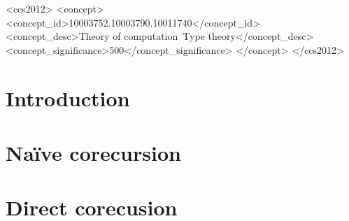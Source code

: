 \documentclass[sigplan, screen, natbib=false, review]{acmart}
\begin{document}
\begin{CCSXML}
  <ccs2012>
  <concept>
  <concept_id>10003752.10003790.10011740</concept_id>
  <concept_desc>Theory of computation~Type theory</concept_desc>
  <concept_significance>500</concept_significance>
  </concept>
  </ccs2012>
\end{CCSXML}




\maketitle

\section{Introduction}\label{sec:intro}


\section{Naïve corecursion}\label{sec:problem}



\section{Direct corecusion}\label{sec:direct}

\end{document}
